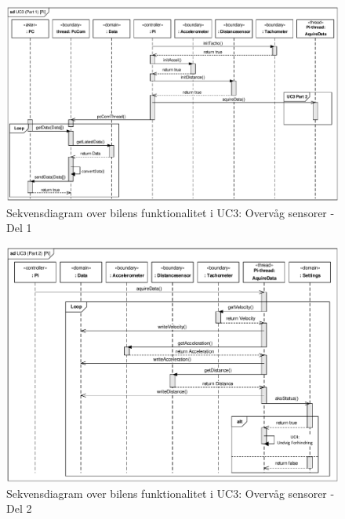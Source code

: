 \begin{landscape}

\begin{figure}[h]
\centering
\includegraphics[]{../fig/diagrammer/bil/sd_uc3_1.pdf}
\caption{Sekvensdiagram over  bilens funktionalitet i UC3: Overvåg sensorer - Del 1}
\label{fig:sd_uc3_1_bil}
\end{figure}

\begin{figure}[h]
\centering
\includegraphics[]{../fig/diagrammer/bil/sd_uc3_2.pdf}
\caption{Sekvensdiagram over  bilens funktionalitet i UC3: Overvåg sensorer - Del 2}
\label{fig:sd_uc3_2_bil}
\end{figure}

\end{landscape}

